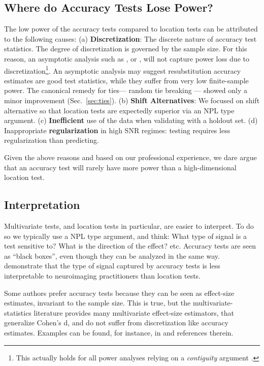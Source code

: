 \documentclass[12pt,a4paper]{article}
\begin{document}
\subsection{Where do Accuracy Tests Lose Power?}
The low power of the accuracy tests compared to location tests can be attributed to the following causes: \newline
(a) \textbf{Discretization}: 
The discrete nature of accuracy test statistics. 
The degree of discretization is governed by the sample size. 
For this reason, an asymptotic analysis such as \cite{ramdas_classification_2016}, or \cite{golland_permutation_2005}, will not capture power loss due to discretization\footnote{This actually holds for all power analyses relying on a \emph{contiguity} argument \cite[Ch.6]{vaart_asymptotic_1998}.}.
An asymptotic analysis may suggest resubstitution accuracy estimates are good test statistics, while they suffer from very low finite-sample power. 
The canonical remedy for ties--- random tie breaking --- showed only a minor improvement (Sec.~\ref{sec:ties}). \newline
(b) \textbf{Shift Alternatives}: 
We focused on shift alternative so that location tests are expectedly superior via an NPL type argument.\newline
(c) \textbf{Inefficient} use of the data when validating with a holdout set. \newline
(d) Inappropriate \textbf{regularization} in high SNR regimes: testing requires less regularization than predicting. \newline

Given the above reasons and based on our professional experience, we dare argue that an accuracy test will rarely have more power than a high-dimensional location test. 




\subsection{Interpretation}
Multivariate tests, and location tests in particular, are easier to interpret. 
To do so we typically use a NPL type argument, and think:
What type of signal is a test sensitive to?
What is the direction of the effect? etc.
Accuracy tests are seen as ``black boxes'', even though they can be analyzed in the same way. 
\citet{gilron2017s} demonstrate that the type of signal captured by accuracy tests is less interpretable to neuroimaging practitioners than location tests. 

Some authors prefer accuracy tests because they can be seen as effect-size estimates, invariant to the sample size. 
This is true, but the multivariate-statistics literature provides many multivariate effect-size estimators, that generalize Cohen's d, and do not suffer from discretization like accuracy estimates. 
Examples can be found, for instance, in \cite{stevens2012applied} and references therein. 
\end{document}
